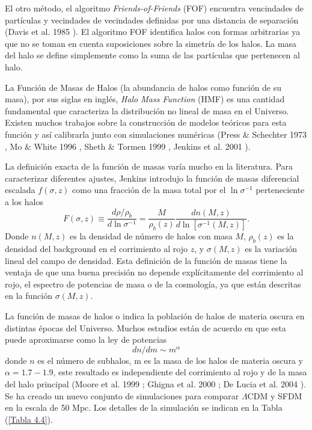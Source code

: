 \documentclass[a4paper,openright,12pt]{book}
\begin{document}
El otro método, el algoritmo \textit{Friends-of-Friends} (FOF) encuentra vencindades de partículas y vecindades de vecindades definidas por una distancia de separación (Davis et al. 1985 \cite{4.4}). El algoritmo FOF identifica halos con formas arbitrarias ya que no se toman en cuenta suposiciones sobre la simetría de los halos. La masa del halo se define simplemente como la suma  de las partículas que pertenecen al halo.
 

La Función de Masas de Halos (la abundancia de halos como función de su masa), por sus siglas en inglés, \textit{Halo Mass Function} (HMF) es una cantidad fundamental que caracteriza la distribución no lineal de masa en el Universo. Existen muchos trabajos sobre la construcción de modelos teóricos para esta función y así calibrarla junto con simulaciones numéricas (Press \& Schechter 1973 \cite{4.4.2}, Mo \& White 1996 \cite{4.4.3}, Sheth \& Tormen 1999 \cite{4.4.4}, Jenkins et al. 2001 \cite{4.4.5}). 

La definición exacta de la función de masas varía mucho en la literatura. Para caracterizar diferentes ajustes, Jenkins introdujo la función de masas diferencial escalada  $f(\sigma, z)$ como una fracción de la masa total por el $\ln \sigma^{-1}$ perteneciente a los halos
\begin{equation}
F(\sigma, z) \equiv \frac{d \rho/\rho_{b}}{d \ln \sigma^{-1}}
=
\frac{M}{\rho_{b}(z)}\frac{d n(M,z)}{d\ln[\sigma^{-1}(M,z)]}.
\end{equation}
Donde $n(M,z)$ es la densidad de número de halos con masa $M$, $\rho_{b}(z)$ es la densidad del background en el corrimiento al rojo $z$, y $\sigma(M,z)$ es la variación lineal del campo de densidad. Esta definición de la función de masas tiene la ventaja de que una buena precisión no depende explícitamente del corrimiento al rojo, el espectro de potencias de masa o de la cosmología, ya que están descritas en la función $\sigma(M,z)$.

La función de masas de halos o  indica la población de halos de materia oscura en distintas épocas del Universo. Muchos estudios están de acuerdo en que esta puede aproximarse como la ley de potencias
\begin{equation}
dn/dm \sim m^{\alpha}\label{eqn 4.11}
\end{equation}
donde $n$ es el número de subhalos, m es la masa de los halos de materia oscura y $\alpha = 1.7 - 1.9$, este resultado es independiente del corrimiento al rojo y de la masa del halo principal (Moore et al. 1999 \cite{4.4.6}; Ghigna et al. 2000 \cite{4.4.7}; De Lucia et al. 2004 \cite{4.4.8}). Se ha creado un nuevo conjunto de simulaciones para comparar $\Lambda$CDM y SFDM en la escala de 50 Mpc. Los detalles de la simulación se indican en la Tabla (\ref{Tabla 4.4}).
\end{document}
